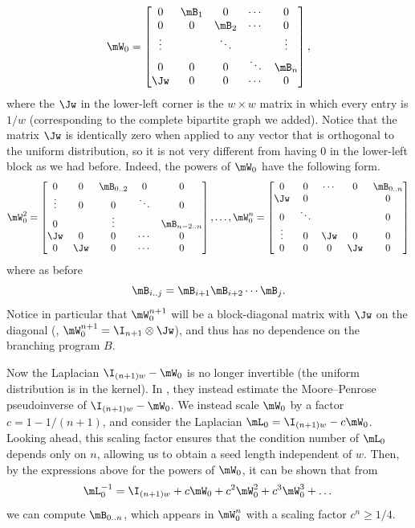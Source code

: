 \documentclass{toc}
\begin{document}
    \begin{equation}
        \mW_0 =
    \begin{bmatrix}
    0 & \mB_1 & 0 & \cdots & 0 \\
    0 & 0 & \mB_2 & \cdots & 0 \\
    \vdots & & \ddots & & \vdots\\
    0 & 0 & 0 & \ddots & \mB_n\\
    \Jw & 0 & 0 & \cdots &  0 \\
    \end{bmatrix}, \label{eqn:bWhat}
    \end{equation}
    where the $\Jw$ in the lower-left corner is the $w\times w$ matrix in which every entry is $1/w$ (corresponding to the complete bipartite graph we added).  Notice that the matrix $\Jw$ is identically zero when applied to any vector that is orthogonal to the uniform distribution, so it is not very different %
    from having $0$ in the lower-left block as we had before. Indeed, the powers of $\mW_0$ have the following form. %
    \begin{equation} \label{eqn:bWhatpowers} 
    \mW_0^2 =
    \begin{bmatrix}
    0 & 0 & \mB_{0..2} & 0 & 0 \\
    \vdots & 0 & 0 & \ddots & 0 \\
    0 & & \vdots & & \mB_{n-2..n}\\
    \Jw & 0 & 0 & \cdots & 0\\
    0& \Jw & 0 & \cdots &  0 \\
    \end{bmatrix}, \ldots,
    \mW_0^n =
    \begin{bmatrix}
    0 & 0 & \cdots & 0 & \mB_{0..n} \\
    \Jw & 0 &  &  & 0 \\
    0 & \ddots &  & & 0\\
    \vdots & 0 & \Jw & 0 & 0\\
    0& 0 & 0 & \Jw &  0 \\
    \end{bmatrix}
    \end{equation}
    where as before 
    $$\mB_{i..j} = \mB_{i+1}\mB_{i+2}\cdots \mB_j.$$
    Notice in particular that $\mW_0^{n+1}$ will be a block-diagonal
    matrix with %
    $\Jw$ %
on the diagonal (\ie, $\mW_0^{n+1}=\I_{n+1}\otimes \Jw$), and thus has no dependence on the branching program $B$.
    
    Now the Laplacian $\I_{(n+1)w}-\mW_0$ is no longer invertible (the uniform distribution is in the kernel).  In \cite{AhmadinejadKeMuPeSiVa19}, they instead estimate the Moore--Penrose pseudoinverse of $\I_{(n+1)w}-\mW_0$. We instead scale $\mW_0$ by a factor $c=1-1/(n+1)$, and consider the Laplacian $\mL_0=\I_{(n+1)w}-c\mW_0$. Looking ahead, this scaling factor ensures that the condition number of $\mL_0$ depends only on $n$, allowing us to obtain a seed length independent of $w$. Then, by the expressions above for the powers of $\mW_0$, it can be shown that from
    $$\mL^{-1}_0 = \I_{(n+1)w}+c\mW_0+c^2\mW_0^2+c^3\mW_0^3+\dots$$
    we can compute $\mB_{0..n}$, which appears in $\mW_0^n$ with a scaling factor $c^n\geq 1/4$.
   
\end{document}
